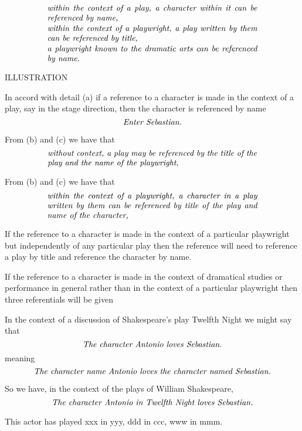 \begin{oldtt}

\begin{gather}
\text{\parbox{9cm}{\textit{within the context of a play, a character within it can be referenced by name,}}} \label{aWords}\\
\text{\parbox{9cm}{\textit{within the context of a playwright, a play written by them can be referenced by title,}}}\label{bWords} \\
\text{\parbox{9cm}{\textit{a playwright known to the dramatic arts can be referenced by name.}}}\label{cWords}
\end{gather}

ILLUSTRATION

\mynote
In accord with detail (a) if a reference to a character is made  in the context of a play,
say in the stage direction, then the character is referenced by name 
\begin{equation*}
\text{\textit{Enter Sebastian.}}
\end{equation*}

From (b) and  (c) we have that
\begin{equation}
\text{\parbox{9cm}{\textit{without context, a play 
may be referenced by the title of the play and the name of the playwright,}}} 
\label{absolutePlayReferencing}
\end{equation}

From (b) and  (c) we have that
\begin{equation}
\text{\parbox{9cm}{\textit{within the context of a playwright, a character in a play written by them can be referenced by title of the play and name of the character,}}}
\label{playwrightRelativeCharacterReferencing}
\end{equation}

\mynote 
If the reference to a character is made in the context of a particular playwright but independently of any particular play then the reference will need to reference a play by title and reference the character by name. 

If the reference to a character is made in the context of dramatical studies or performance in general rather than in the context of a particular playwright then three referentials will be given 


In the context of a discussion of Shakespeare's play Twelfth Night we might say that
\begin{equation}
\label{AntonioLovesSebastian}
\mbox{\textit{The character Antonio loves Sebastian.}}
\end{equation} 
meaning
\begin{equation}
\label{AntonioLovesSebastianPedantic}
\mbox{\textit{The character name Antonio loves the character named Sebastian.}}
\end{equation} 

\mynote 
So we have, in the context of the plays of William Shakespeare,
\begin{equation}
\label{AntonioLovesSebastian}
\mbox{\textit{The character Antonio in Twelfth Night loves Sebastian.}}
\end{equation} 

This actor has played xxx in yyy, ddd in ccc, www in mmm.
\end{oldtt}
